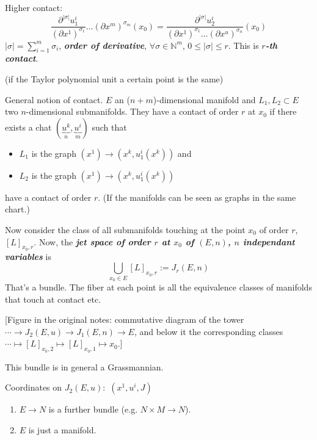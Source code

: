 Higher contact:
$$\frac{\partial^{|\sigma|}u^i_1}{(\partial
x^1)^{\sigma_1}}\ldots(\partial
x^m)^{\sigma_m}(x_0)=
\frac{\partial^{|\sigma|}u_2^i}{(\partial
x^1)^{\sigma_1}\ldots(\partial
x^u)^{\sigma_n}}(x_0)$$
$|\sigma|=\sum_{i=1}^m \sigma_i$, {\it\bf
order of derivative},  $\forall  \sigma \in
\mathbb{N}^m$, $0\leq  | \sigma|\leq  r$.
This is {\it\bf $r$-th contact}.

(if the Taylor polynomial unit a certain
point is the same)

General notion of contact. $E$ an
($n+m$)-dimensional manifold and  $L_1,L_2
\subset E$ two $n$-dimensional submanifolds.
They have a contact of order $r$ at $x_0$ if
there exists a chat
$(\underbrace{u^k}_{n},\underbrace{u^i}_{m})$
such that
\begin{itemize}
\item $L_1$ is the graph $(x^1)\to
(x^k,u^i_1(x^k))$ and
\item $L_2$ is the graph $(x^1) \to
(x^k,u^i_1(x^k))$
\end{itemize}
have a contact of order $r$. (If the
manifolds can be seen as graphs in the same
chart.)

Now consider the class of all submanifolds
touching at the point $x_0$ of order $r$,
$[L]_{x_0,r}$. Now, the {\it\bf jet space of
order $r$ at $x_0$ of $(E,n)$, $n$
independant variables} is
$$\bigcup_{x_0 \in E}[L]_{x_0,r}:=J_r(E,n)$$
That's a bundle. The fiber at each point is
all the equivalence classes of manifolds that
touch at contact etc.

[Figure in the original notes: commutative
diagram of the tower $\cdots \to J_2(E,u)\to
J_1(E,n)\to E$, and below it the
corresponding classes $\cdots \mapsto
[L]_{x_0,2}\mapsto [L]_{x_0,1}\mapsto x_0$.]

\begin{remark}
\label{remark-wdvv-grassmannian}
This bundle is in general a Grassmannian.
\end{remark}

Coordinates on $J_2(E,u):$ $(x^1,u^i,J)$
\begin{enumerate}
\item $E \to N$ is a further bundle (e.g.
$N\times M \to N$).
\item $E$ is just a  manifold.
\end{enumerate}

